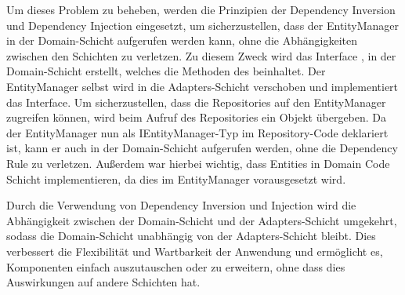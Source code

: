Um dieses Problem zu beheben, werden die Prinzipien der Dependency Inversion und Dependency Injection eingesetzt, um sicherzustellen, dass der EntityManager in der Domain-Schicht aufgerufen werden kann, ohne die Abhängigkeiten zwischen den Schichten zu verletzen.
Zu diesem Zweck wird das Interface \href{https://github.com/MichaelaHaag/RezeptApp/tree/main/3-Domain-Code/src/main/java/de/rezeptapp/domain/IEntityManager.java}{}, in der Domain-Schicht erstellt, welches die Methoden des  beinhaltet. Der EntityManager selbst wird in die Adapters-Schicht verschoben und implementiert das  Interface. Um sicherzustellen, dass die Repositories auf den EntityManager zugreifen können, wird beim Aufruf des Repositories ein  Objekt übergeben. Da der EntityManager nun als IEntityManager-Typ im Repository-Code deklariert ist, kann er auch in der Domain-Schicht aufgerufen werden, ohne die Dependency Rule zu verletzen. Außerdem war hierbei wichtig, dass Entities in Domain Code Schicht \href{https://github.com/MichaelaHaag/RezeptApp/tree/main/3-Domain-Code/src/main/java/de/rezeptapp/domain/IPersistierbar.java}{} implementieren, da dies im EntityManager vorausgesetzt wird. 

Durch die Verwendung von Dependency Inversion und Injection wird die Abhängigkeit zwischen der Domain-Schicht und der Adapters-Schicht umgekehrt, sodass die Domain-Schicht unabhängig von der Adapters-Schicht bleibt. Dies verbessert die Flexibilität und Wartbarkeit der Anwendung und ermöglicht es, Komponenten einfach auszutauschen oder zu erweitern, ohne dass dies Auswirkungen auf andere Schichten hat.



